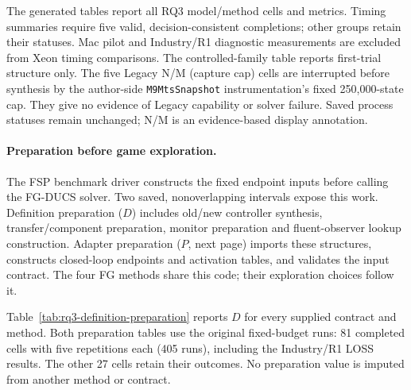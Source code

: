 \documentclass[11pt]{article}
\begin{document}
The generated tables report all RQ3 model/method cells and metrics. Timing summaries require five valid, decision-consistent completions; other groups retain their statuses. Mac pilot and Industry/R1 diagnostic measurements are excluded from Xeon timing comparisons. The controlled-family table reports first-trial structure only.
The five Legacy N/M (capture cap) cells are interrupted before synthesis by the author-side \texttt{M9MtsSnapshot} instrumentation's fixed 250,000-state cap. They give no evidence of Legacy capability or solver failure. Saved process statuses remain unchanged; N/M is an evidence-based display annotation.



\begin{table}[ht]
\centering\small
\caption{Full main-campaign outcome grid for all 135 instance--method cells.}

\end{table}
\par\medskip

\begin{table}[!htbp]
\caption{RQ3 solver medians in seconds: Lazy / Direct-Full for all 27 supplied contracts. Every numeric median uses five completed runs.}
\label{tab:rq3-absolute}
\centering\small

\end{table}

\clearpage
\paragraph{Preparation before game exploration.}
The FSP benchmark driver constructs the fixed endpoint inputs before calling the FG-DUCS solver. Two saved, nonoverlapping intervals expose this work. Definition preparation ($D$) includes old/new controller synthesis, transfer/component preparation, monitor preparation and fluent-observer lookup construction. Adapter preparation ($P$, next page) imports these structures, constructs closed-loop endpoints and activation tables, and validates the input contract. The four FG methods share this code; their exploration choices follow it.

Table~\ref{tab:rq3-definition-preparation} reports $D$ for every supplied contract and method. Both preparation tables use the original fixed-budget runs: 81 completed cells with five repetitions each (405 runs), including the Industry/R1 LOSS results. The other 27 cells retain their outcomes. No preparation value is imputed from another method or contract.
\end{document}
